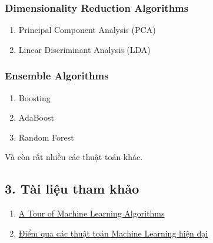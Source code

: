 \hypertarget{dimensionality-reduction-algorithms}{\subsubsection{Dimensionality
Reduction Algorithms}\label{dimensionality-reduction-algorithms}}

\begin{enumerate}
\def\labelenumi{\arabic{enumi}.}
\tightlist
\item
  Principal Component Analysis (PCA)
\item
  Linear Discriminant Analysis (LDA)
\end{enumerate}

\hypertarget{ensemble-algorithms}{\subsubsection{Ensemble
Algorithms}\label{ensemble-algorithms}}

\begin{enumerate}
\def\labelenumi{\arabic{enumi}.}
\tightlist
\item
  Boosting
\item
  AdaBoost
\item
  Random Forest
\end{enumerate}

Và còn rất nhiều các thuật toán khác.

\subsection{3. Tài liệu tham
khảo}\label{tuxe0i-liux1ec7u-tham-khux1ea3o}

\begin{enumerate}
\def\labelenumi{\arabic{enumi}.}
\item
  \href{http://machinelearningmastery.com/a-tour-of-machine-learning-algorithms/}{A
  Tour of Machine Learning Algorithms}
\item
  \href{https://ongxuanhong.wordpress.com/2015/10/22/diem-qua-cac-thuat-toan-machine-learning-hien-dai/}{Điểm
  qua các thuật toán Machine Learning hiện đại}
\end{enumerate}
